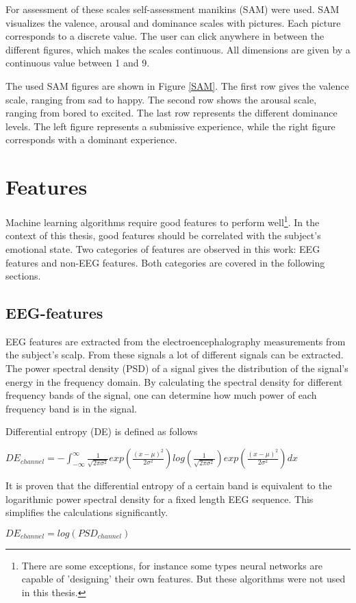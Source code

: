 \npar

For assessment of these scales self-assessment manikins (SAM) were used\cite{DEAP}. SAM visualizes the valence, arousal and dominance scales with pictures. Each picture corresponds to a discrete value. The user can click anywhere in between the different figures, which makes the scales continuous. All dimensions are given by a continuous value between 1 and 9.

\npar

The used SAM figures are shown in Figure \ref{SAM}. The first row gives the valence scale, ranging from sad to happy. The second row shows the arousal scale, ranging from bored to excited. The last row represents the different dominance levels. The left figure represents a submissive experience, while the right figure corresponds with a dominant experience.


\section{Features}
\label{featuresExplained}
Machine learning algorithms require good features to perform well\footnote{There are some exceptions, for instance some types neural networks are capable of 'designing' their own features\citep{nnfeat}. But these algorithms were not used in this thesis.}. In the context of this thesis, good features should be correlated with the subject's emotional state. Two categories of features are observed in this work: EEG features and non-EEG features. Both categories are covered in the following sections.

\subsection{EEG-features}
EEG features are extracted from the electroencephalography measurements from the subject's scalp. From these signals a lot of different signals can be extracted. The power spectral density (PSD)  of a signal gives the distribution of the signal's energy in the frequency domain. By calculating the spectral density for different frequency bands of the signal, one can determine how much power of each frequency band is in the signal.

\npar

Differential entropy (DE) is defined as follows \citep{killyPaper} \\
\begin{center}
$DE_{channel} = - \int_{-\infty}^{\infty} \frac{1}{\sqrt{2\pi\sigma^2}} exp(\frac{(x-\mu)^2}{2\sigma^2}) log(\frac{1}{\sqrt{2\pi\sigma^2}}) exp(\frac{(x-\mu)^2}{2\sigma^2})dx$
\end{center}
It is proven that the differential entropy of a certain band is equivalent to the logarithmic power spectral density for a fixed length EEG sequence\citep{diffEnt}. This simplifies the calculations significantly.
\begin{center}
$DE_{channel} = log(PSD_{channel})$
\end{center}

